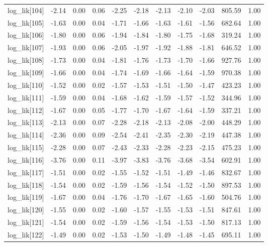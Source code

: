 \begin{table}[ht]
\begin{tabular}{rrrrrrrrrrr}
  log\_lik[104] & -2.14 & 0.00 & 0.06 & -2.25 & -2.18 & -2.13 & -2.10 & -2.03 & 805.59 & 1.00 \\ 
  log\_lik[105] & -1.63 & 0.00 & 0.04 & -1.71 & -1.66 & -1.63 & -1.61 & -1.56 & 682.64 & 1.00 \\ 
  log\_lik[106] & -1.80 & 0.00 & 0.06 & -1.94 & -1.84 & -1.80 & -1.75 & -1.68 & 319.24 & 1.00 \\ 
  log\_lik[107] & -1.93 & 0.00 & 0.06 & -2.05 & -1.97 & -1.92 & -1.88 & -1.81 & 646.52 & 1.00 \\ 
  log\_lik[108] & -1.73 & 0.00 & 0.04 & -1.81 & -1.76 & -1.73 & -1.70 & -1.66 & 927.76 & 1.00 \\ 
  log\_lik[109] & -1.66 & 0.00 & 0.04 & -1.74 & -1.69 & -1.66 & -1.64 & -1.59 & 970.38 & 1.00 \\ 
  log\_lik[110] & -1.52 & 0.00 & 0.02 & -1.57 & -1.53 & -1.51 & -1.50 & -1.47 & 423.23 & 1.00 \\ 
  log\_lik[111] & -1.59 & 0.00 & 0.04 & -1.68 & -1.62 & -1.59 & -1.57 & -1.52 & 344.96 & 1.00 \\ 
  log\_lik[112] & -1.67 & 0.00 & 0.05 & -1.77 & -1.70 & -1.67 & -1.64 & -1.59 & 337.21 & 1.00 \\ 
  log\_lik[113] & -2.13 & 0.00 & 0.07 & -2.28 & -2.18 & -2.13 & -2.08 & -2.00 & 448.29 & 1.00 \\ 
  log\_lik[114] & -2.36 & 0.00 & 0.09 & -2.54 & -2.41 & -2.35 & -2.30 & -2.19 & 447.38 & 1.00 \\ 
  log\_lik[115] & -2.28 & 0.00 & 0.07 & -2.43 & -2.33 & -2.28 & -2.23 & -2.15 & 475.23 & 1.00 \\ 
  log\_lik[116] & -3.76 & 0.00 & 0.11 & -3.97 & -3.83 & -3.76 & -3.68 & -3.54 & 602.91 & 1.00 \\ 
  log\_lik[117] & -1.51 & 0.00 & 0.02 & -1.55 & -1.52 & -1.51 & -1.49 & -1.46 & 832.67 & 1.00 \\ 
  log\_lik[118] & -1.54 & 0.00 & 0.02 & -1.59 & -1.56 & -1.54 & -1.52 & -1.50 & 897.53 & 1.00 \\ 
  log\_lik[119] & -1.67 & 0.00 & 0.04 & -1.76 & -1.70 & -1.67 & -1.65 & -1.60 & 504.76 & 1.00 \\ 
  log\_lik[120] & -1.55 & 0.00 & 0.02 & -1.60 & -1.57 & -1.55 & -1.53 & -1.51 & 847.61 & 1.00 \\ 
  log\_lik[121] & -1.54 & 0.00 & 0.02 & -1.59 & -1.56 & -1.54 & -1.53 & -1.50 & 817.13 & 1.00 \\ 
  log\_lik[122] & -1.49 & 0.00 & 0.02 & -1.53 & -1.50 & -1.49 & -1.48 & -1.45 & 695.11 & 1.00 \\ 

\end{tabular}
\end{table}
